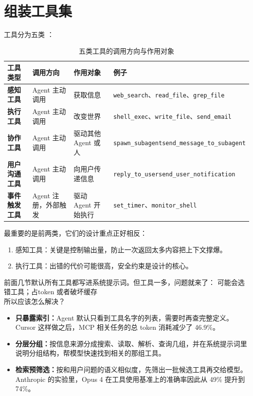 \section{组装工具集}
工具分为五类 ：
\begin{table}[H]
\centering
\caption{五类工具的调用方向与作用对象}
\label{tab:tool-types}
\begin{tabular}{p{2.4cm} p{2.6cm} p{3.4cm} p{6.2cm}}
  \toprule
  工具类型 & 调用方向 & 作用对象 & 例子 \\
  \midrule
  \textbf{感知工具}     & Agent 主动调用 & 获取信息 &
    \texttt{web\_search}、\texttt{read\_file}、\texttt{grep\_file} \\
  \addlinespace
  \textbf{执行工具}     & Agent 主动调用 & 改变世界 &
    \texttt{shell\_exec}、\texttt{write\_file}、\texttt{send\_email} \\
  \addlinespace
  \textbf{协作工具}     & Agent 主动调用 & 驱动其他 Agent 或人 &
    \texttt{spawn\_subagent}\newline \texttt{send\_message\_to\_subagent} \\
  \addlinespace
  \textbf{用户沟通工具} & Agent 主动调用 & 向用户传递信息 &
    \texttt{reply\_to\_user}\newline \texttt{send\_user\_notification} \\
  \addlinespace
  \textbf{事件触发工具} & Agent 注册，外部触发 & 驱动 Agent 开始执行 &
    \texttt{set\_timer}、\texttt{monitor\_shell} \\
  \bottomrule
\end{tabular}
\end{table}
最重要的是前两类，它们的设计重点正好相反：

\begin{enumerate}
  \item 感知工具：关键是控制输出量，防止一次返回太多内容把上下文撑爆。
  \item 执行工具：出错的代价可能很高，安全约束是设计的核心。
\end{enumerate}
前面几节默认所有工具都写进系统提示词。但工具一多，问题就来了：  可能会选错工具；占token 或者破坏缓存\\

所以应该怎么解决？

\begin{itemize}
  \item \textbf{只暴露索引：}Agent 默认只看到工具名字的列表，需要时再查完整定义。Cursor 这样做之后，MCP 相关任务的总 token 消耗减少了 46.9\%。
  \item \textbf{分层分组：}按信息来源分成搜索、读取、解析、查询几组，并在系统提示词里说明分组结构，帮模型快速找到相关的那组工具。
  \item \textbf{检索预筛选：}按和用户问题的语义相似度，先筛出一批候选工具再交给模型。Anthropic 的实验里，Opus 4 在工具使用基准上的准确率因此从 49\% 提升到 74\%。
\end{itemize}

